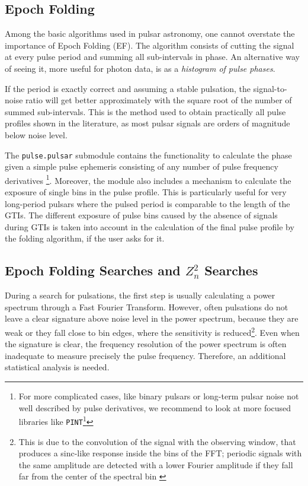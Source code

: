 \documentclass[twocolumn]{aastex62}
\newcommand{\zsq}{\ensuremath{Z^2_n}\xspace}
\begin{document}
\subsection{Epoch Folding}
Among the basic algorithms used in pulsar astronomy, one cannot overstate the importance of Epoch Folding (EF).
The algorithm consists of cutting the signal at every pulse period and summing all sub-intervals in phase. 
An alternative way of seeing it, more useful for photon data, is as a \textit {histogram of pulse phases}.

If the period is exactly correct and assuming a stable pulsation, the signal-to-noise ratio will get better approximately with the square root of the number of summed sub-intervals.
This is the method used to obtain practically all pulse profiles shown in the literature, as most pulsar signals are orders of magnitude below noise level.

The \texttt{pulse.pulsar} submodule contains the functionality to calculate the phase given a simple pulse ephemeris consisting of any number of pulse frequency derivatives%
\footnote{For more complicated cases, like binary pulsars or long-term pulsar noise not well described by pulse derivatives, we recommend to look at more focused libraries like \texttt{PINT}\footnote{\url{https://github.com/nanograv/PINT}}}.
Moreover, the module also includes a mechanism to calculate the exposure of single bins in the pulse profile. 
This is particularly useful for very long-period pulsars where the pulsed period is comparable to the length of the GTIs.
The different exposure of pulse bins caused by the absence of signals during GTIs is taken into account in the calculation of the final pulse profile by the folding algorithm, if the user asks for it. 

\subsection{Epoch Folding Searches and \zsq Searches}
\label{sec:efzsq}
During a search for pulsations, the first step is usually calculating a power spectrum through a Fast Fourier Transform. 
However, often pulsations do not leave a clear signature above noise level in the power spectrum, because they are weak or they fall close to bin edges, where the sensitivity is reduced\footnote{This is due to the convolution of the signal with the observing window, that produces a sinc-like response inside the bins of the FFT; periodic signals with the same amplitude are detected with a lower Fourier amplitude if they fall far from the center of the spectral bin \citep{vanderklis1989}}.
Even when the signature is clear, the frequency resolution of the power spectrum is often inadequate to measure precisely the pulse frequency.
Therefore, an additional statistical analysis is needed. 
\end{document}

